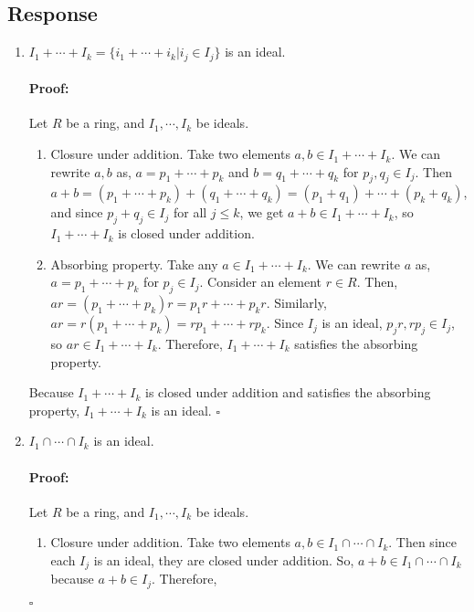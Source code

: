 \documentclass [12pt] {article}
\newenvironment{proof}{\paragraph{Proof:}}{\hfill$\square$}
\begin{document}
\subsection*{Response}
\begin{enumerate}
    \item $I_1+\cdots+I_k=\{i_1+\cdots+i_k|i_j\in I_j\}$ is an ideal.
        \begin{proof}
            Let $R$ be a ring, and $I_1, \cdots, I_k$ be ideals.
            \begin{enumerate}
                \item Closure under addition. Take two elements $a, b \in I_1 + \cdots + I_k$. We can
                    rewrite $a, b$ as,
                    $a = p_1 + \cdots + p_k$ and $b = q_1 + \cdots + q_k$ for $p_j, q_j \in I_j$. Then
                    $
                    a + b 
                    = (p_1 + \cdots + p_k) + (q_1 + \cdots + q_k)
                    = (p_1 + q_1) + \cdots + (p_k + q_k)
                    $, and since $p_j + q_j \in I_j$ for all $j \leq k$, we get 
                    $a + b \in I_1 + \cdots + I_k$, so $I_1 + \cdots + I_k$ is closed under addition.
                \item Absorbing property. Take any $a \in I_1 + \cdots + I_k$. We can
                    rewrite $a$ as, $a = p_1 + \cdots + p_k$ for $p_j \in I_j$. Consider an element $r \in R$. 
                    Then, $ar = (p_1 + \cdots + p_k) r = p_1 r + \cdots + p_k r$. Similarly,
                    $ar = r (p_1 + \cdots + p_k) = r p_1 + \cdots + r p_k$. Since $I_j$ is an ideal, 
                    $p_j r, r p_j \in I_j$, so $ar \in I_1 + \cdots + I_k$. Therefore, $I_1 + \cdots + I_k$ 
                    satisfies the absorbing property.
            \end{enumerate}
            Because $I_1 + \cdots + I_k$ is closed under addition and satisfies the absorbing property, 
            $I_1 + \cdots + I_k$ is an ideal.
        \end{proof}
    \item $I_1 \cap \cdots \cap I_k$ is an ideal.
        \begin{proof}
            Let $R$ be a ring, and $I_1, \cdots, I_k$ be ideals.
            \begin{enumerate}
                \item Closure under addition. Take two elements $a, b \in I_1 \cap \cdots \cap I_k$. 
                    Then since each $I_j$ is an ideal, they are closed under addition. So, 
                    $a + b \in I_1 \cap \cdots \cap I_k$ because $a + b \in I_j$. Therefore, 

\end{enumerate}
\end{proof}
\end{enumerate}
\end{document}
